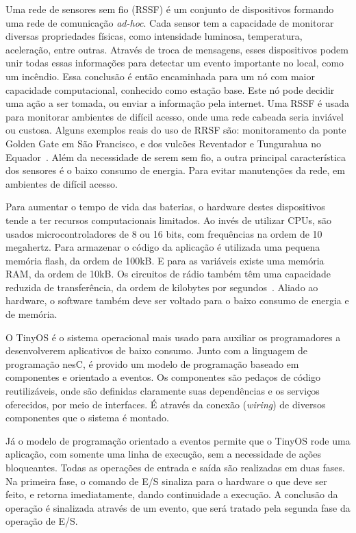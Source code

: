 Uma rede de sensores sem fio (RSSF) é um conjunto de dispositivos formando uma rede de comunicação \textit{ad-hoc}. Cada
sensor tem a capacidade de monitorar diversas propriedades físicas, como intensidade luminosa, temperatura, aceleração,
entre outras. Através de troca de mensagens, esses dispositivos podem unir todas essas informações para detectar um evento
importante no local, como um incêndio. Essa conclusão é então encaminhada para um nó com maior capacidade computacional,
conhecido como estação base. Este nó pode decidir uma ação a ser tomada, ou enviar a informação pela internet. Uma RSSF
é usada para monitorar ambientes de difícil acesso, onde uma rede cabeada seria inviável ou custosa.
Alguns exemplos reais do uso de RRSF são: monitoramento da ponte Golden Gate em São Francisco, e dos vulcões Reventador e Tungurahua no
Equador~\cite{LevisGay/09}. 
Além da necessidade de serem sem fio, a outra principal característica dos sensores é o baixo consumo de energia. Para
evitar manutenções da rede, em ambientes de difícil acesso.

Para aumentar o tempo de vida das baterias, o hardware destes dispositivos tende a ter recursos computacionais
limitados. Ao invés de utilizar CPUs, são usados microcontroladores de 8 ou 16 bits, com frequências na ordem de 10
megahertz. Para armazenar o código da aplicação é utilizada uma pequena memória flash, da ordem de 100kB. E para as
variáveis existe uma memória RAM, da ordem de 10kB. Os circuitos de rádio também têm uma capacidade reduzida de
transferência, da ordem de kilobytes por segundos~\cite{LevisGay/09}.
Aliado ao hardware, o software também deve ser voltado para o baixo consumo de energia e de memória.

O TinyOS é o sistema operacional mais usado para auxiliar os programadores a desenvolverem aplicativos de baixo consumo. Junto com a
linguagem de programação nesC, é provido um modelo de programação baseado em componentes e orientado a eventos.
Os componentes são pedaços de código reutilizáveis, onde são definidas claramente suas dependências e os serviços
oferecidos, por meio de interfaces. É através da conexão (\textit{wiring}) de diversos componentes que o sistema é montado.

Já o modelo de programação orientado a eventos permite que o TinyOS rode uma aplicação, com somente uma linha de
execução, sem a necessidade de ações bloqueantes. Todas as operações de entrada e saída são realizadas em duas fases.
Na primeira fase, o comando de E/S sinaliza para o hardware o que deve ser feito, e retorna imediatamente, dando continuidade a
execução. A conclusão da operação é sinalizada através de um evento, que será tratado pela segunda fase da operação de E/S.

